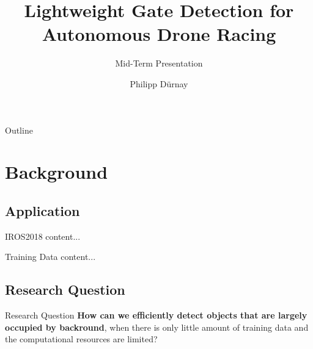 \documentclass{beamer}
\title{Lightweight Gate Detection for Autonomous Drone Racing} %
\subtitle{Mid-Term Presentation} %
\author{Philipp Dürnay}
\begin{document}
  \frame{\maketitle}


  \begin{darkframes}
  	\begin{frame}{Outline}
  		\tableofcontents
  	\end{frame}
    \section{Background}
    \subsection{Application}
    \begin{frame}{IROS2018}
    	content...
    \end{frame}
    \begin{frame}{Training Data}
       	content...
    \end{frame}
	\subsection{Research Question}    
	\begin{frame}{Research Question}
	\textbf{How can we efficiently detect objects that are largely occupied by backround}, when there is only little amount of training data and the computational resources are limited?
	\end{frame}

\end{darkframes}
\end{document}
